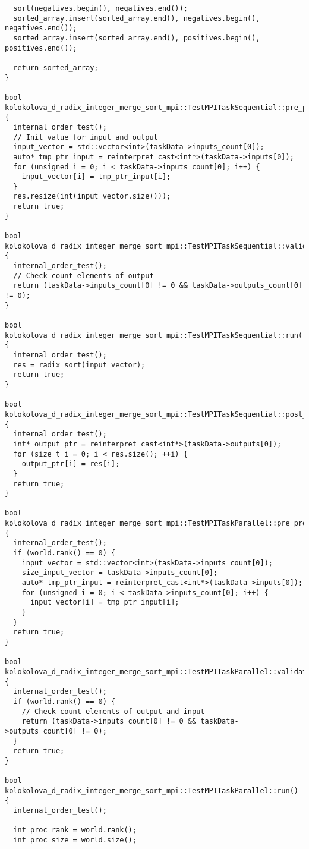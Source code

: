 \documentclass[12pt]{article}
\begin{document}
\begin{lstlisting}
  sort(negatives.begin(), negatives.end());
  sorted_array.insert(sorted_array.end(), negatives.begin(), negatives.end());
  sorted_array.insert(sorted_array.end(), positives.begin(), positives.end());

  return sorted_array;
}

bool kolokolova_d_radix_integer_merge_sort_mpi::TestMPITaskSequential::pre_processing() {
  internal_order_test();
  // Init value for input and output
  input_vector = std::vector<int>(taskData->inputs_count[0]);
  auto* tmp_ptr_input = reinterpret_cast<int*>(taskData->inputs[0]);
  for (unsigned i = 0; i < taskData->inputs_count[0]; i++) {
    input_vector[i] = tmp_ptr_input[i];
  }
  res.resize(int(input_vector.size()));
  return true;
}

bool kolokolova_d_radix_integer_merge_sort_mpi::TestMPITaskSequential::validation() {
  internal_order_test();
  // Check count elements of output
  return (taskData->inputs_count[0] != 0 && taskData->outputs_count[0] != 0);
}

bool kolokolova_d_radix_integer_merge_sort_mpi::TestMPITaskSequential::run() {
  internal_order_test();
  res = radix_sort(input_vector);
  return true;
}

bool kolokolova_d_radix_integer_merge_sort_mpi::TestMPITaskSequential::post_processing() {
  internal_order_test();
  int* output_ptr = reinterpret_cast<int*>(taskData->outputs[0]);
  for (size_t i = 0; i < res.size(); ++i) {
    output_ptr[i] = res[i];
  }
  return true;
}

bool kolokolova_d_radix_integer_merge_sort_mpi::TestMPITaskParallel::pre_processing() {
  internal_order_test();
  if (world.rank() == 0) {
    input_vector = std::vector<int>(taskData->inputs_count[0]);
    size_input_vector = taskData->inputs_count[0];
    auto* tmp_ptr_input = reinterpret_cast<int*>(taskData->inputs[0]);
    for (unsigned i = 0; i < taskData->inputs_count[0]; i++) {
      input_vector[i] = tmp_ptr_input[i];
    }
  }
  return true;
}

bool kolokolova_d_radix_integer_merge_sort_mpi::TestMPITaskParallel::validation() {
  internal_order_test();
  if (world.rank() == 0) {
    // Check count elements of output and input
    return (taskData->inputs_count[0] != 0 && taskData->outputs_count[0] != 0);
  }
  return true;
}

bool kolokolova_d_radix_integer_merge_sort_mpi::TestMPITaskParallel::run() {
  internal_order_test();

  int proc_rank = world.rank();
  int proc_size = world.size();


\end{lstlisting}
\end{document}
